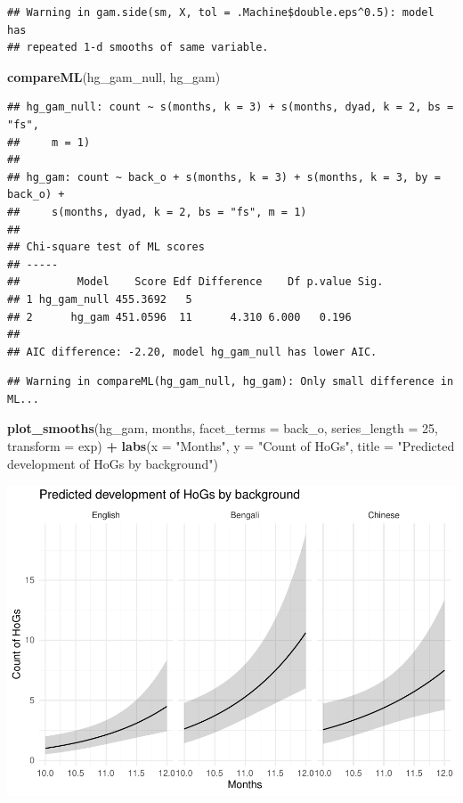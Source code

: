 \documentclass[]{article}
\newenvironment{Shaded}{\begin{snugshade}}{\end{snugshade}}
\newcommand{\DataTypeTok}[1]{\textcolor[rgb]{0.13,0.29,0.53}{#1}}
\newcommand{\DecValTok}[1]{\textcolor[rgb]{0.00,0.00,0.81}{#1}}
\newcommand{\KeywordTok}[1]{\textcolor[rgb]{0.13,0.29,0.53}{\textbf{#1}}}
\newcommand{\NormalTok}[1]{#1}
\newcommand{\OperatorTok}[1]{\textcolor[rgb]{0.81,0.36,0.00}{\textbf{#1}}}
\newcommand{\StringTok}[1]{\textcolor[rgb]{0.31,0.60,0.02}{#1}}
\begin{document}
\begin{verbatim}
## Warning in gam.side(sm, X, tol = .Machine$double.eps^0.5): model has
## repeated 1-d smooths of same variable.
\end{verbatim}

\begin{Shaded}
\begin{Highlighting}[]
\KeywordTok{compareML}\NormalTok{(hg_gam_null, hg_gam)}
\end{Highlighting}
\end{Shaded}

\begin{verbatim}
## hg_gam_null: count ~ s(months, k = 3) + s(months, dyad, k = 2, bs = "fs", 
##     m = 1)
## 
## hg_gam: count ~ back_o + s(months, k = 3) + s(months, k = 3, by = back_o) + 
##     s(months, dyad, k = 2, bs = "fs", m = 1)
## 
## Chi-square test of ML scores
## -----
##         Model    Score Edf Difference    Df p.value Sig.
## 1 hg_gam_null 455.3692   5                              
## 2      hg_gam 451.0596  11      4.310 6.000   0.196     
## 
## AIC difference: -2.20, model hg_gam_null has lower AIC.
\end{verbatim}

\begin{verbatim}
## Warning in compareML(hg_gam_null, hg_gam): Only small difference in ML...
\end{verbatim}

\begin{Shaded}
\begin{Highlighting}[]
\KeywordTok{plot_smooths}\NormalTok{(hg_gam, months, }\DataTypeTok{facet_terms =}\NormalTok{ back_o, }\DataTypeTok{series_length =} \DecValTok{25}\NormalTok{, }\DataTypeTok{transform =}\NormalTok{ exp) }\OperatorTok{+}
\StringTok{  }\KeywordTok{labs}\NormalTok{(}\DataTypeTok{x =} \StringTok{"Months"}\NormalTok{, }\DataTypeTok{y =} \StringTok{"Count of HoGs"}\NormalTok{, }\DataTypeTok{title =} \StringTok{"Predicted development of HoGs by background"}\NormalTok{)}
\end{Highlighting}
\end{Shaded}

\includegraphics{supplement_files/figure-latex/hg-gam-plot-1.pdf}
\end{document}
